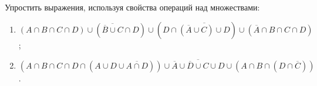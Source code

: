 \question
Упростить выражения, используя свойства операций над множествами:

\begin{enumerate}
	\renewcommand{\labelenumi}{\alph{enumi})}
	\item $(A\cap B \cap C \cap D) \cup (\overline{\overline{B}\cup C}\cap D) \cup (D\cap\overline{(\overline{A}\cup C)\cup D})\cup (\overline{A}\cap B\cap C \cap D)$;
	\item $(A\cap B \cap C \cap D \cap (A\cup D \cup \overline{A\cap D}))\cup \overline{\overline{A}\cup \overline{D}\cup C\cup D}\cup (A\cap B \cap (D\cap\overline{C}))$.
\end{enumerate}
